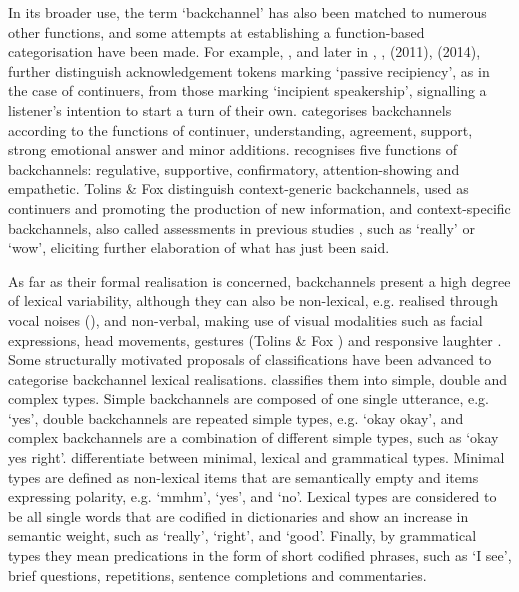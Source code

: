 In its broader use, the term ‘backchannel’ has also been matched to numerous other functions, and some attempts at establishing a function-based categorisation have been made. For example, \citet{Jefferson1983}, \citet{DrummondHopper1993} and later in \citet{JurafskyEtAl1998}, \citet{Savino2010}, (2011), (2014), \citet{SavinoRefice2013} further distinguish acknowledgement tokens marking ‘passive recipiency’, as in the case of continuers, from those marking ‘incipient speakership’, signalling a listener’s intention to start a turn of their own. \citet{Senk1997} categorises backchannels according to the functions of continuer, understanding, agreement, support, strong emotional answer and minor additions. \citet{Kjellmer2009} recognises five functions of backchannels: regulative, supportive, confirmatory, attention-showing and empathetic. Tolins \& Fox \citet{Tree2014} distinguish context-generic backchannels, used as continuers and promoting the production of new information, and context-specific backchannels, also called assessments in previous studies \citep{Goodwin1986}, such as ‘really’ or ‘wow’, eliciting further elaboration of what has just been said.

As far as their formal realisation is concerned, backchannels present a high degree of lexical variability, although they can also be non-lexical, e.g. realised through vocal noises (\citealt{WongPeters2007}), and non-verbal, making use of visual modalities such as facial expressions, head movements, gestures (Tolins \& Fox \citealt{Tree2014}) and responsive laughter \citep{Hasegawa2014}. Some structurally motivated proposals of classifications have been advanced to categorise backchannel lexical realisations. \citet{Tottie1991} classifies them into simple, double and complex types. Simple backchannels are composed of one single utterance, e.g. ‘yes’, double backchannels are repeated simple types, e.g. ‘okay okay’, and complex backchannels are a combination of different simple types, such as ‘okay yes right’. \citet{WongPeters2007} differentiate between minimal, lexical and grammatical types. Minimal types are defined as non-lexical items that are semantically empty and items expressing polarity, e.g. ‘mmhm’, ‘yes’, and ‘no’. Lexical types are considered to be all single words that are codified in dictionaries and show an increase in semantic weight, such as ‘really’, ‘right’, and ‘good’. Finally, by grammatical types they mean predications in the form of short codified phrases, such as ‘I see’, brief questions, repetitions, sentence completions and commentaries.

